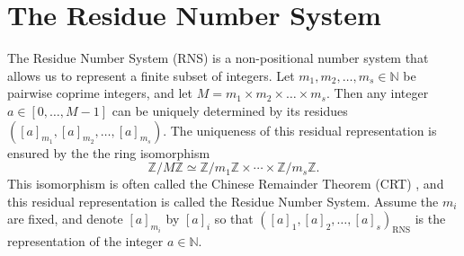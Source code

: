 \documentclass[acmtoms]{acmsmall}
\def\N{\mathbb{N}}
\def\Z{\mathbb{Z}}
\begin{document}

%
%
%
%


\section{The Residue Number System}
\label{sec:rns-overview}

 
The Residue Number System (RNS) is a non-positional number system that allows us to represent a
finite subset of integers.  Let $m_1, m_2, \dots, m_s \in \N$ be pairwise coprime integers, and let
$M = m_1\times m_2 \times \hdots \times m_s$. Then any integer $a \in [0,\hdots,M-1]$ can be
uniquely determined by its residues $( [a]_{m_1}, [a]_{m_2}, \dots, [a]_{m_s})$. The uniqueness of
this residual representation is ensured by the the ring isomorphism
\begin{equation}\label{eq:crt} 
	\Z/M\Z \simeq \Z/m_1\Z \times \cdots \times \Z/m_s\Z.
\end{equation} 
This isomorphism is often called the Chinese Remainder Theorem (CRT) \cite[Section 5.4]{GaGe03}, and
this residual representation is called the Residue Number System. Assume the $m_i$ are fixed, and
denote $[a]_{m_i}$ by $[a]_i$ so that $([a]_1,[a]_2,\dots,[a]_s)_{\text{RNS}}$ is the representation
of the integer $a \in \N$.
\end{document}
